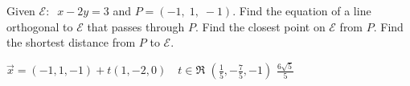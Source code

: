 
\begin{Exercise}[
name={},
title={}, 
difficulty=0,
origin={\cite{YL}}]
Given $\mathcal{E}:\;\; x-2y=3$ and $P=(-1,\;1,\;-1)$.
\Question Find the equation of a line orthogonal to $\mathcal{E}$ that passes through $P$.
\Question Find the closest point on $\mathcal{E}$ from $P$.
\Question Find the shortest distance from $P$ to $\mathcal{E}$.
\end{Exercise}

\begin{Answer}
\Question $\vec{x}=(-1,1,-1)+t(1,-2,0)\quad t\in\Re$
\Question $(\frac15,-\frac75,-1)$
\Question $\frac{6\sqrt{5}}{5}$
\end{Answer}
